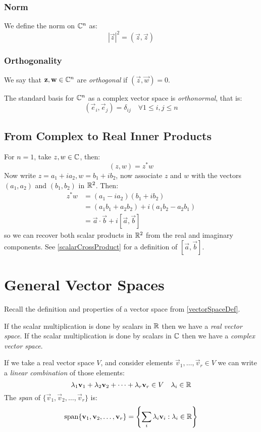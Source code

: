 \documentclass[../main.tex]{subfiles}
\begin{document}
\subsubsection{Norm}
We define the norm on $\mathbb{C}^{n}$ as:
\[
  |\vec{z}|^2 = (\vec{z}, \vec{z})
\]
\subsubsection{Orthogonality}
We say that $\boldsymbol{\mathbf{z}}, \boldsymbol{\mathbf{w}} \in \mathbb{C}^{n}$  are \textit{orthogonal} if $(\vec{z}, \vec{w}) = 0$.

The standard basis for $\mathbb{C}^{n}$ as a complex vector space is \textit{orthonormal}, that is:
\[
  (\vec{e}_i, \vec{e}_j) = \delta_{i j}\quad\forall 1 \leq i, j \leq n
\]
\subsection{From Complex to Real Inner Products}
For $n = 1$, take $z, w \in \mathbb{C}$, then:
\[
  (z, w) = z^{*}w
\]
Now write $z = a_1 + ia_2, w = b_1 + ib_2$, now associate $z$ and $w$ with the vectors $(a_1, a_2)$ and $(b_1, b_2)$ in $\mathbb{R}^2$.
Then:
\begin{align*}
  z^{*}w &= (a_1 - i a_2)(b_1 + i b_2) \\
         &= (a_1 b_1 + a_2 b_2) + i(a_1 b_2 - a_2 b_1) \\
         &= \vec{a} \cdot \vec{b} + i[\vec{a}, \vec{b}]
\end{align*}
so we can recover both scalar products in $\mathbb{R}^{2}$ from the real and imaginary components.
See \cref{scalarCrossProduct} for a definition of $[\vec{a}, \vec{b}]$.
\section{General Vector Spaces}
\begin{remark}[Recap]\par
Recall the definition and properties of a vector space from \cref{vectorSpaceDef}.

If the scalar multiplication is done by scalars in $\mathbb{R}$ then we have a \textit{real vector space}.
If the scalar multiplication is done by scalars in $\mathbb{C}$ then we have a \textit{complex vector space}.

If we take a real vector space $V$, and consider elements $\vec{v}_1, \ldots, \vec{v}_r \in V$ we can write a \textit{linear combination} of those elements:
\[
  \lambda_1 \boldsymbol{\mathbf{v}}_1 + \lambda_2 \boldsymbol{\mathbf{v}}_2 + \cdots + \lambda_r \boldsymbol{\mathbf{v}}_r \in V \quad \lambda_i \in \mathbb{R}
\]
The \textit{span} of $\{\vec{v}_1, \vec{v}_2, \ldots, \vec{v}_r\}$ is:
\[
  \operatorname{span}\{\boldsymbol{\mathbf{v}}_1, \boldsymbol{\mathbf{v}}_2, \ldots, \boldsymbol{\mathbf{v}}_r\} = \left\{\sum_{i}^{} \lambda_i \boldsymbol{\mathbf{v}}_i : \lambda_i \in \mathbb{R}\right\}
\]
\end{remark}
\end{document}
